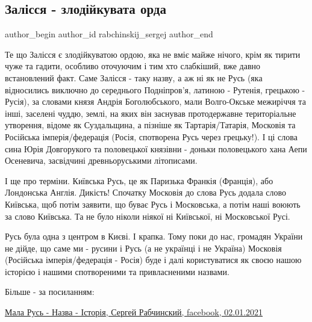  
 
 
 
 
 
\subsection{Залісся - злодійкувата орда}
\label{sec:29_07_2021.fb.rabchinskij_sergej.1.zalesje_orda}
 
\ifcmt
 author_begin
   author_id rabchinskij_sergej
 author_end
\fi

Те що Залісся є злодійкуватою ордою, яка не вміє майже нічого, крім як тирити
чуже та гадити, особливо оточуючим і тим хто слабкіший, вже давно встановлений
факт. Саме Залісся - таку назву, а аж ні як не Русь (яка відносились виключно
до середнього Подніпров'я, латиною - Рутенія, грецькою - Русія), за словами
князя Андрія Боголюбського, мали Волго-Окське межиріччя та інші, заселені
чуддю, землі, на яких він заснував протодержавне територіальне утворення,
відоме як Суздальщина, а пізніше як Тартарія/Татарія, Московія та Російська
імперія/федерація (Росія, спотворена Русь через грецьку!). І ці слова сина Юрія
Довгорукого та половецької князівни - доньки половецького хана Аепи Осеневича,
засвідчині древньоруськими літописами.

І ще про терміни. Київська Русь, це як Паризька Франкія (Франція), або
Лондонська Англія. Дикість! Спочатку Московія до слова Русь додала слово
Київська, щоб потім заявити, що буває Русь і Московська, а потім наші воюють за
слово Київська. Та не було ніколи ніякої ні Київської, ні Московської Русі.

Русь була одна з центром в Києві. І крапка. Тому поки до нас, громадян України
не дійде, що саме ми - русини і Русь (а не українці і не Україна) Московія
(Російська імперія/федерація - Росія) буде і далі користуватися як своєю нашою
історією і нашими спотвореними та привласненими назвами. 

Більше - за посиланням:

\href{https://www.facebook.com/sergii.rabchynskyi/posts/783001818965763}{%
Мала Русь - Назва - Історія, Сергей Рабчинский, facebook, 02.01.2021%
}
